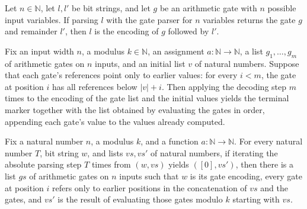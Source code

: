 \begin{theorem}
\label{Randomized.PIT.parse_eq_some}
\leanok
{}
Let $n\in\mathbb{N}$, let $l,l'$ be bit strings, and let $g$ be an arithmetic gate with
$n$ possible input variables. If parsing $l$ with the gate parser for $n$ variables
returns the gate $g$ and remainder $l'$, then $l$ is the encoding of $g$ followed by
$l'$.
\end{theorem}

\begin{theorem}
\label{Randomized.PIT.iterate_absStep_encodeGates}
\leanok
{}
Fix an input width $n$, a modulus $k\in\mathbb{N}$, an assignment
$a:\mathbb{N}\to\mathbb{N}$, a list $g_1,\ldots,g_m$ of arithmetic gates on $n$ inputs,
and an initial list $v$ of natural numbers. Suppose that each gate's references point
only to earlier values: for every $i<m$, the gate at position $i$ has all references
below $|v|+i$. Then applying the decoding step $m$ times to the encoding of the gate
list and the initial values yields the terminal marker together with the list obtained
by evaluating the gates in order, appending each gate's value to the values already
computed.
\end{theorem}

\begin{theorem}
\label{Randomized.PIT.exists_of_iterate_absStep}
\leanok
{}
Fix a natural number $n$, a modulus $k$, and a function $a:\mathbb{N}\to\mathbb{N}$. For
every natural number $T$, bit string $w$, and lists $vs,vs'$ of natural numbers, if
iterating the absolute parsing step $T$ times from $(w,vs)$ yields $( [0],vs')$, then
there is a list $gs$ of arithmetic gates on $n$ inputs such that $w$ is its gate
encoding, every gate at position $i$ refers only to earlier positions in the
concatenation of $vs$ and the gates, and $vs'$ is the result of evaluating those gates
modulo $k$ starting with $vs$.
\end{theorem}

